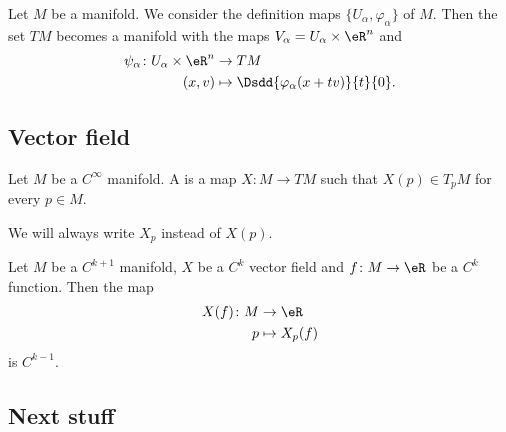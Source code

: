 \begin{theorem}     \label{THOooTSQXooLvJMQb}
    Let \( M\) be a manifold. We consider the definition maps \( \{ U_{\alpha}, \varphi_{\alpha} \}\) of \( M\). Then the set \( TM\) becomes a manifold with the maps \( V_{\alpha}=U_{\alpha}\times \eR^n\) and
    \begin{equation}
        \begin{aligned}
            \psi_{\alpha}\colon U_{\alpha}\times \eR^n&\to TM \\
            (x,v)&\mapsto \Dsdd{ \varphi_{\alpha}(x+tv) }{t}{0}. 
        \end{aligned}
    \end{equation}
\end{theorem}


\subsection{Vector field}

\begin{definition}
    Let \( M\) be a \(  C^{\infty}\) manifold. A  is a map \( X\colon M\to TM\) such that \( X(p)\in T_pM\) for every \( p\in M\).

    We will always write \( X_p\) instead of \( X(p)\).
\end{definition}

\begin{proposition}
    Let \( M\) be a \( C^{k+1}\) manifold, \( X\) be a \( C^k\) vector field and \( f\colon M \to \eR\) be a \( C^k\) function. Then the map
    \begin{equation}
        \begin{aligned}
            X(f)\colon M&\to \eR \\
            p&\mapsto X_p(f) 
        \end{aligned}
    \end{equation}
    is \( C^{k-1}\).
\end{proposition}

\subsection{Next stuff}

